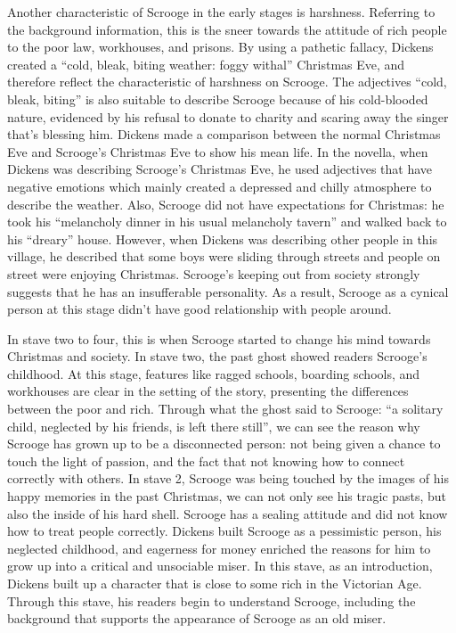 \documentclass[11pt, oneside]{article}   	%
\begin{document}
Another characteristic of Scrooge in the early stages is harshness. Referring to the background information, this is the sneer towards the attitude of rich people to the poor law, workhouses, and prisons. By using a pathetic fallacy, Dickens created a ``cold, bleak, biting weather: foggy withal'' Christmas Eve, and therefore reflect the characteristic of harshness on Scrooge. The adjectives ``cold, bleak, biting'' is also suitable to describe Scrooge because of his cold-blooded nature, evidenced by his refusal to donate to charity and scaring away the singer that's blessing him. Dickens made a comparison between the normal Christmas Eve and Scrooge's Christmas Eve to show his mean life. In the novella, when Dickens was describing Scrooge's Christmas Eve, he used adjectives that have negative emotions which mainly created a depressed and chilly atmosphere to describe the weather. Also, Scrooge did not have expectations for Christmas: he took his ``melancholy dinner in his usual melancholy tavern'' and walked back to his ``dreary'' house. However, when Dickens was describing other people in this village, he described that some boys were sliding through streets and people on street were enjoying Christmas. Scrooge's keeping out from society strongly suggests that he has an insufferable personality.  As a result, Scrooge as a cynical person at this stage didn't have good relationship with people around.


In stave two to four, this is when Scrooge started to change his mind towards Christmas and society. In stave two, the past ghost showed readers Scrooge’s childhood. At this stage, features like ragged schools, boarding schools, and workhouses are clear in the setting of the story, presenting the differences between the poor and rich. Through what the ghost said to Scrooge: “a solitary child, neglected by his friends, is left there still”, we can see the reason why Scrooge has grown up to be a disconnected person: not being given a chance to touch the light of passion, and the fact that not knowing how to connect correctly with others. In stave 2, Scrooge was being touched by the images of his happy memories in the past Christmas, we can not only see his tragic pasts, but also the inside of his hard shell. Scrooge has a sealing attitude and did not know how to treat people correctly. Dickens built Scrooge as a pessimistic person, his neglected childhood, and eagerness for money enriched the reasons for him to grow up into a critical and unsociable miser. In this stave, as an introduction, Dickens built up a character that is close to some rich in the Victorian Age. Through this stave, his readers begin to understand Scrooge, including the background that supports the appearance of Scrooge as an old miser. 
\end{document}
